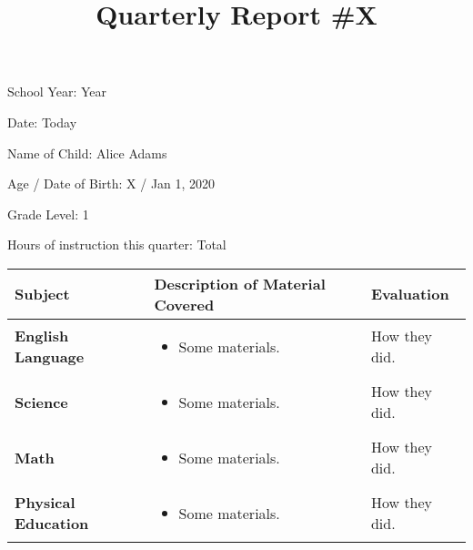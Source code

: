 \documentclass[10pt]{article}
\title{Quarterly Report \#X}
\author{}
\date{}
\begin{document}
\maketitle
\begin{multicols}{2}
  School Year: Year

  Date: Today

  Name of Child: Alice Adams

  Age / Date of Birth: X / Jan 1, 2020

  Grade Level: 1

  Hours of instruction this quarter: Total
\end{multicols}

\noindent\begin{tabularx}{\textwidth}{ |p{2in}|X|X| }

\hline

{\bf Subject} & {\bf Description of Material Covered} & { \bf
  Evaluation } \\

\hline

{\bf English Language} &
\begin{itemize}
\item Some materials.
\end{itemize} & 

How they did. \\

\hline

{\bf Science}  &
\begin{itemize}
\item Some materials.
\end{itemize} &

How they did. \\

\hline

{\bf Math} &
\begin{itemize}
\item Some materials.
\end{itemize} &

How they did. \\

\hline

{\bf Physical Education} &
\begin{itemize}
\item Some materials.
\end{itemize} &

How they did. \\

\hline


\end{tabularx}
\end{document}
